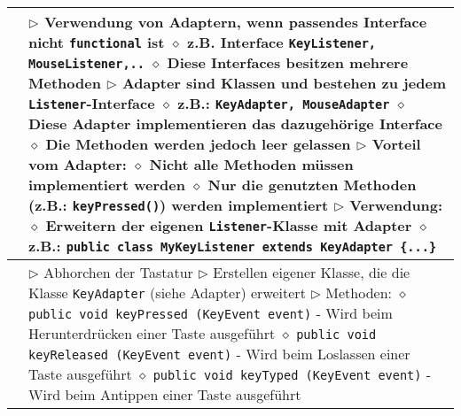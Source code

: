 \begin{longtable}{ | p{} p{} | }
	\makecell[l]{Adapter} & \makecell[l]{
	$\triangleright$ Verwendung von Adaptern, wenn passendes Interface nicht \texttt{functional} ist \\
	\hspace{0.4cm} $\diamond$ z.B. Interface \texttt{KeyListener, MouseListener,..} \\
	\hspace{0.4cm} $\diamond$ Diese Interfaces besitzen mehrere Methoden \\
	$\triangleright$ Adapter sind Klassen und bestehen zu jedem \texttt{Listener}-Interface \\
	\hspace{0.4cm} $\diamond$ z.B.: \texttt{KeyAdapter, MouseAdapter} \\
	\hspace{0.4cm} $\diamond$ Diese Adapter implementieren das dazugehörige Interface \\
	\hspace{0.4cm} $\diamond$ Die Methoden werden jedoch leer gelassen \\
	$\triangleright$ Vorteil vom Adapter: \\
	\hspace{0.4cm} $\diamond$ Nicht alle Methoden müssen implementiert werden \\
	\hspace{0.4cm} $\diamond$ Nur die genutzten Methoden (z.B.: \texttt{keyPressed()}) werden implementiert \\
	$\triangleright$ Verwendung: \\
	\hspace{0.4cm} $\diamond$ Erweitern der eigenen \texttt{Listener}-Klasse mit Adapter \\
	\hspace{0.4cm} $\diamond$ z.B.: \texttt{public class MyKeyListener extends KeyAdapter \{...\}}} \\ \hline

	\makecell[l]{Interface KeyListener} & \makecell[l]{
	$\triangleright$ Abhorchen der Tastatur \\
	$\triangleright$ Erstellen eigener Klasse, die die Klasse \texttt{KeyAdapter} (siehe Adapter) erweitert \\
	$\triangleright$ Methoden: \\
	\hspace{0.4cm} $\diamond$ \texttt{public void keyPressed (KeyEvent event)} \\
	\hspace{0.6cm} - Wird beim Herunterdrücken einer Taste ausgeführt \\
	\hspace{0.4cm} $\diamond$ \texttt{public void keyReleased (KeyEvent event)} \\
	\hspace{0.6cm} - Wird beim Loslassen einer Taste ausgeführt \\
	\hspace{0.4cm} $\diamond$ \texttt{public void keyTyped (KeyEvent event)} \\
	\hspace{0.6cm} - Wird beim Antippen einer Taste ausgeführt} \\ \hline


\end{longtable}
